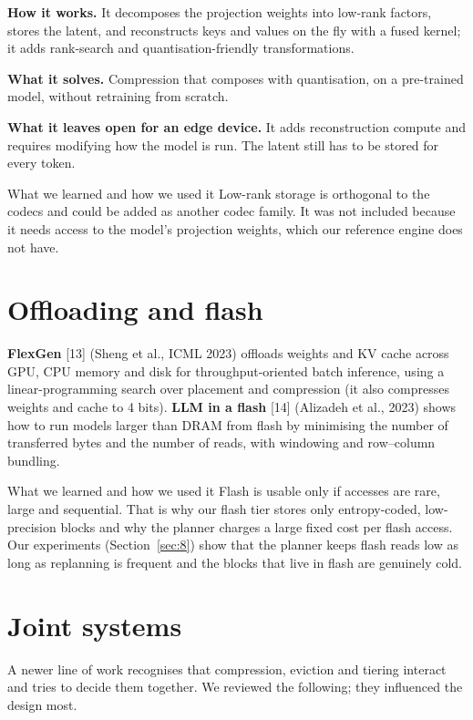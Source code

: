 \documentclass[12pt,a4paper]{report}
\begin{document}
\textbf{How it works.} It decomposes the projection weights into low-rank factors, stores the latent, and reconstructs keys and values on the fly with a fused kernel; it adds rank-search and quantisation-friendly transformations.

\textbf{What it solves.} Compression that composes with quantisation, on a pre-trained model, without retraining from scratch.

\textbf{What it leaves open for an edge device.} It adds reconstruction compute and requires modifying how the model is run. The latent still has to be stored for every token.

\begin{calloutbox}{What we learned and how we used it}
Low-rank storage is orthogonal to the codecs and could be added as another codec family. It was not included because it needs access to the model's projection weights, which our reference engine does not have.

\end{calloutbox}
\section{Offloading and flash}\label{sec:2_8}
\textbf{FlexGen} [13] (Sheng et al., ICML 2023) offloads weights and KV cache across GPU, CPU memory and disk for throughput-oriented batch inference, using a linear-programming search over placement and compression (it also compresses weights and cache to 4 bits). \textbf{LLM in a flash} [14] (Alizadeh et al., 2023) shows how to run models larger than DRAM from flash by minimising the number of transferred bytes and the number of reads, with windowing and row–column bundling.

\begin{calloutbox}{What we learned and how we used it}
Flash is usable only if accesses are rare, large and sequential. That is why our flash tier stores only entropy-coded, low-precision blocks and why the planner charges a large fixed cost per flash access. Our experiments (Section~\ref{sec:8}) show that the planner keeps flash reads low as long as replanning is frequent and the blocks that live in flash are genuinely cold.

\end{calloutbox}
\section{Joint systems}\label{sec:2_9}
A newer line of work recognises that compression, eviction and tiering interact and tries to decide them together. We reviewed the following; they influenced the design most.
\end{document}
